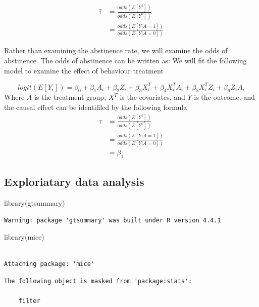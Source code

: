 \documentclass[
  letterpaper,
  DIV=11,
  numbers=noendperiod]{scrartcl}
\newenvironment{Shaded}{\begin{snugshade}}{\end{snugshade}}
\newcommand{\FunctionTok}[1]{\textcolor[rgb]{0.28,0.35,0.67}{#1}}
\newcommand{\NormalTok}[1]{\textcolor[rgb]{0.00,0.23,0.31}{#1}}
\begin{document}
\[
\begin{aligned}
\hat{\tau} &= \frac{odds(E[Y^1])}{odds(E[Y^0])} \\
&= \frac{odds(E[Y|A = 1])}{odds(E[Y|A = 0])}
\end{aligned}
\]

Rather than examining the abstinence rate, we will examine the odds of
abstinence. The odds of abstinence can be written as: We will fit the
following model to examine the effect of behaviour treatment

\[
logit(E[Y_i]) = \beta_0  + \beta_1A_i + \beta_2Z_i + \beta_3X_i^T  + \beta_4X_i^TA_i + \beta_5X_i^TZ_i +\beta_6Z_iA_i
\] Where \(A\) is the treatment group, \(X^T\) is the covariates, and
\(Y\) is the outcome. and the causal effect can be identifiled by the
following formula \[
\begin{aligned}
\tau &= \frac{odds(E[Y^1])}{odds(E[Y^0])} \\
&= \frac{odds(E[Y|A = 1])}{odds(E[Y|A = 0])} \\
&= \beta_1
\end{aligned}
\]

\subsection{Exploriatary data
analysis}\label{exploriatary-data-analysis}

\begin{Shaded}
\begin{Highlighting}[]
\FunctionTok{library}\NormalTok{(gtsummary)}
\end{Highlighting}
\end{Shaded}

\begin{verbatim}
Warning: package 'gtsummary' was built under R version 4.4.1
\end{verbatim}

\begin{Shaded}
\begin{Highlighting}[]
\FunctionTok{library}\NormalTok{(mice)}
\end{Highlighting}
\end{Shaded}

\begin{verbatim}

Attaching package: 'mice'
\end{verbatim}

\begin{verbatim}
The following object is masked from 'package:stats':

    filter
\end{verbatim}
\end{document}
